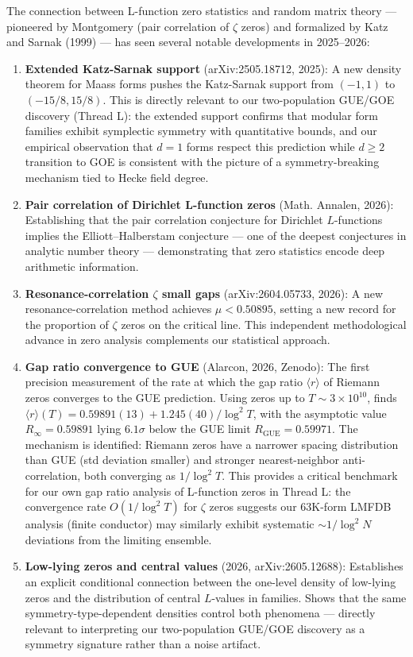 \documentclass[
]{article}
\begin{document}
The connection between L-function zero statistics and random matrix
theory --- pioneered by Montgomery (pair correlation of \(\zeta\) zeros)
and formalized by Katz and Sarnak (1999) --- has seen several notable
developments in 2025--2026:

\begin{enumerate}
\def\labelenumi{\arabic{enumi}.}
\item
  \textbf{Extended Katz-Sarnak support} (arXiv:2505.18712, 2025): A new
  density theorem for Maass forms pushes the Katz-Sarnak support from
  \((-1,1)\) to \((-15/8, 15/8)\). This is directly relevant to our
  two-population GUE/GOE discovery (Thread L): the extended support
  confirms that modular form families exhibit symplectic symmetry with
  quantitative bounds, and our empirical observation that \(d=1\) forms
  respect this prediction while \(d\ge 2\) transition to GOE is
  consistent with the picture of a symmetry-breaking mechanism tied to
  Hecke field degree.
\item
  \textbf{Pair correlation of Dirichlet L-function zeros} (Math.
  Annalen, 2026): Establishing that the pair correlation conjecture for
  Dirichlet \(L\)-functions implies the Elliott--Halberstam conjecture
  --- one of the deepest conjectures in analytic number theory ---
  demonstrating that zero statistics encode deep arithmetic information.
\item
  \textbf{Resonance-correlation \(\zeta\) small gaps} (arXiv:2604.05733,
  2026): A new resonance-correlation method achieves \(\mu < 0.50895\),
  setting a new record for the proportion of \(\zeta\) zeros on the
  critical line. This independent methodological advance in zero
  analysis complements our statistical approach.
\item
  \textbf{Gap ratio convergence to GUE} (Alarcon, 2026, Zenodo): The
  first precision measurement of the rate at which the gap ratio
  \(\langle r\rangle\) of Riemann zeros converges to the GUE prediction.
  Using zeros up to \(T\sim 3\times 10^{10}\), finds
  \(\langle r\rangle(T) = 0.59891(13) + 1.245(40)/\log^2 T\), with the
  asymptotic value \(R_\infty = 0.59891\) lying \(6.1\sigma\) below the
  GUE limit \(R_\text{GUE} = 0.59971\). The mechanism is identified:
  Riemann zeros have a narrower spacing distribution than GUE (std
  deviation smaller) and stronger nearest-neighbor anti-correlation,
  both converging as \(1/\log^2 T\). This provides a critical benchmark
  for our own gap ratio analysis of L-function zeros in Thread L: the
  convergence rate \(O(1/\log^2 T)\) for \(\zeta\) zeros suggests our
  63K-form LMFDB analysis (finite conductor) may similarly exhibit
  systematic \(\sim 1/\log^2 N\) deviations from the limiting ensemble.
\item
  \textbf{Low-lying zeros and central values} (2026, arXiv:2605.12688):
  Establishes an explicit conditional connection between the one-level
  density of low-lying zeros and the distribution of central
  \(L\)-values in families. Shows that the same symmetry-type-dependent
  densities control both phenomena --- directly relevant to interpreting
  our two-population GUE/GOE discovery as a symmetry signature rather
  than a noise artifact.
\end{enumerate}
\end{document}
